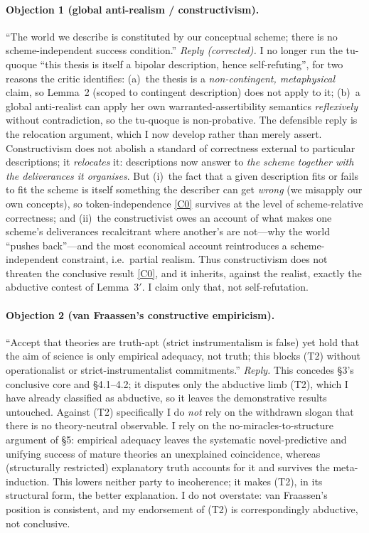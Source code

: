 \documentclass[12pt]{article}
\begin{document}
\paragraph{Objection 1 (global anti-realism / constructivism).} ``The
world we describe is constituted by our conceptual scheme; there is no
scheme-independent success condition.'' \emph{Reply (corrected).} I no
longer run the tu-quoque ``this thesis is itself a bipolar description,
hence self-refuting'', for two reasons the critic identifies: (a)~the
thesis is a \emph{non-contingent, metaphysical} claim, so Lemma~2 (scoped
to contingent description) does not apply to it; (b)~a global anti-realist
can apply her own warranted-assertibility semantics \emph{reflexively}
without contradiction, so the tu-quoque is non-probative. The defensible
reply is the relocation argument, which I now develop rather than merely
assert. Constructivism does not abolish a standard of correctness external
to particular descriptions; it \emph{relocates} it: descriptions now
answer to \emph{the scheme together with the deliverances it organises}.
But (i)~the fact that a given description fits or fails to fit the scheme
is itself something the describer can get \emph{wrong} (we misapply our
own concepts), so token-independence \ref{C0} survives at the level of
scheme-relative correctness; and (ii)~the constructivist owes an account
of what makes one scheme's deliverances recalcitrant where another's are
not---why the world ``pushes back''---and the most economical account
reintroduces a scheme-independent constraint, i.e.\ partial realism. Thus
constructivism does not threaten the conclusive result \ref{C0}, and it
inherits, against the realist, exactly the abductive contest of Lemma~3$'$.
I claim only that, not self-refutation.

\paragraph{Objection 2 (van Fraassen's constructive empiricism).} ``Accept
that theories are truth-apt (strict instrumentalism is false) yet hold
that the aim of science is only empirical adequacy, not truth; this blocks
(T2) without operationalist or strict-instrumentalist commitments.''
\emph{Reply.} This concedes \S3's conclusive core and \S4.1--4.2; it
disputes only the abductive limb (T2), which I have already classified as
abductive, so it leaves the demonstrative results untouched. Against (T2)
specifically I do \emph{not} rely on the withdrawn slogan that there is no
theory-neutral observable. I rely on the no-miracles-to-structure argument
of \S5: empirical adequacy leaves the systematic novel-predictive and
unifying success of mature theories an unexplained coincidence, whereas
(structurally restricted) explanatory truth accounts for it and survives
the meta-induction. This lowers neither party to incoherence; it makes
(T2), in its structural form, the better explanation. I do not overstate:
van Fraassen's position is consistent, and my endorsement of (T2) is
correspondingly abductive, not conclusive.
\end{document}
